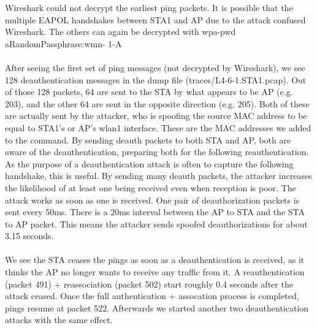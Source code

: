 Wireshark could not decrypt the earliest ping packets. It is possible that the multiple EAPOL handshakes between STA1 and AP due to the attack confused Wireshark. The others can again be decrypted with wpa-pwd aRandomPassphrase:wmn-
1-A \\ \\

After seeing the first set of ping messages (not decrypted by Wireshark), we see 128 deauthentication messages in the dump file (traces/L4-6-1.STA1.pcap).
Out of those 128 packets, 64 are sent to the STA by what appears to be AP (e.g. 203), and the other 64 are sent in the opposite direction (e.g. 205). Both of these are actually sent by the attacker, who is spoofing the source MAC address to be equal to STA1's or AP's wlan1 interface. These are the MAC addresses we added to the command. By sending deauth packets to both STA and AP, both are aware of the deauthentication, preparing both for the following reauthentication. As the purpose of a deauthentication attack is often to capture the following handshake, this is useful. By sending many deauth packets, the attacker increases the likelihood of at least one being received even when reception is poor. The attack works as soon as one is received. One pair of deauthorization packets is sent every 50ms. There is a 20ms interval between the AP to STA and the STA to AP packet. This means the attacker sends spoofed deauthorizations for about 3.15 seconds. \\ \\
%
We see the STA ceases the pings as soon as a deauthentication is received, as it thinks the AP no longer wants to receive any traffic from it. A reauthentication (packet 491) + reassociation (packet 502) start roughly 0.4 seconds after the attack ceased. Once the full authentication + assocation process is completed, pings resume at packet 522. Afterwards we started another two deauthentication attacks with the same effect.
%
